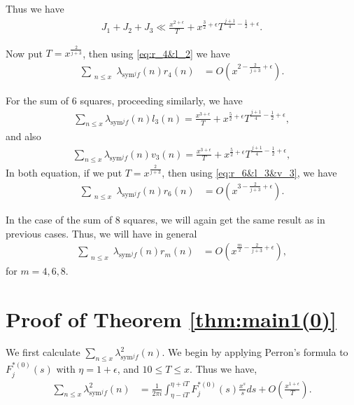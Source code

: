 \documentclass[10pt]{amsart}
\begin{document}
Thus we have \begin{align}
    J_1+J_2+J_3 \ll \frac{x^{2+\epsilon}}{T}+x^{\frac{3}{2}+\epsilon} T^{\frac{j+1}{4}-\frac{1}{2}+\epsilon}.
\end{align}

Now put $T = x^{\frac{2}{j+3}}$, then using \eqref{eq:r_4&l_2} we have \begin{align}
    \sum_{\substack{n\leq x}}\lambda_{\mathrm{sym}^jf}(n)r_4(n) &= O\left( x^{2-\frac{2}{j+3}+\epsilon} \right).
\end{align}

For the sum of $6$ squares, proceeding similarly, we have \begin{align}
    \sum_{n\leq x}\lambda_{\mathrm{sym}^{j}f }(n)l_3(n) = \frac{x^{3+\epsilon}}{T}+x^{\frac{5}{2}+\epsilon} T^{\frac{j+1}{4}-\frac{1}{2}+\epsilon},
\end{align}
and also 
\begin{align}
    \sum_{n\leq x}\lambda_{\mathrm{sym}^{j}f }(n)v_3(n) = \frac{x^{3+\epsilon}}{T}+x^{\frac{5}{2}+\epsilon} T^{\frac{j+1}{4}-\frac{1}{2}+\epsilon},
\end{align}
In both equation, if we put $T = x^{\frac{2}{j+3}}$, then using \eqref{eq:r_6&l_3&v_3}, we have \begin{align}
    \sum_{\substack{n\leq x}}\lambda_{\mathrm{sym}^jf}(n)r_6(n) &= O\left( x^{3-\frac{2}{j+3}+\epsilon} \right).
\end{align}

In the case of the sum of $8$ squares, we will again get the same result as in previous cases. Thus, we will have in general \begin{align}
    \sum_{\substack{n\leq x}}\lambda_{\mathrm{sym}^jf}(n)r_m(n) &= O\left( x^{\frac{m}{2}-\frac{2}{j+3}+\epsilon} \right),
\end{align}
for $m=4,6,8$.

\section{Proof of Theorem \ref{thm:main1(0)}} \label{sec:main1(0)}

We first calculate $\sum_{n\leq x}\lambda_{\mathrm{sym}^{j}f}^2(n)$. We begin by applying Perron's formula to $F_{j}^{*(0)}(s)$ with $\eta=1+\epsilon$, and $10\leq T\leq x$. Thus we have,
\begin{align*}
\sum_{n\leq x}\lambda_{\mathrm{sym}^{j}f}^2(n)
&= \frac{1}{2\pi i}\int_{\eta-iT}^{\eta+iT}F_{j}^{*(0)}(s)\frac{x^{s}}{s}ds + O\left(\frac{x^{1+\epsilon}}{T}\right).
\end{align*}
\end{document}
